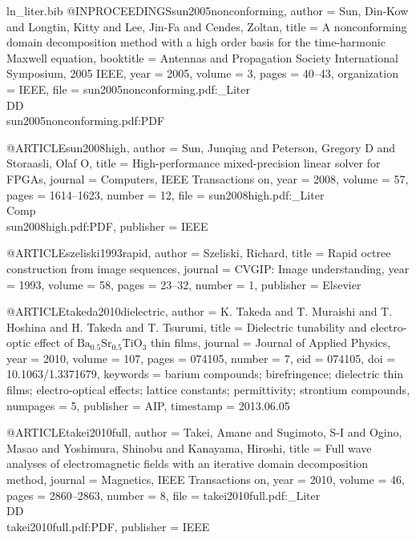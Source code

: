 \begin{filecontents*}{ln_liter.bib}
@INPROCEEDINGS{sun2005nonconforming,
  author = {Sun, Din-Kow and Longtin, Kitty and Lee, Jin-Fa and Cendes, Zoltan},
  title = {A nonconforming domain decomposition method with a high order basis
	for the time-harmonic {M}axwell equation},
  booktitle = {Antennas and Propagation Society International Symposium, 2005 IEEE},
  year = {2005},
  volume = {3},
  pages = {40--43},
  organization = {IEEE},
  file = {sun2005nonconforming.pdf:_Liter\\DD\\sun2005nonconforming.pdf:PDF}
}

@ARTICLE{sun2008high,
  author = {Sun, Junqing and Peterson, Gregory D and Storaasli, Olaf O},
  title = {High-performance mixed-precision linear solver for {FPGAs}},
  journal = {Computers, IEEE Transactions on},
  year = {2008},
  volume = {57},
  pages = {1614--1623},
  number = {12},
  file = {sun2008high.pdf:_Liter\\Comp\\sun2008high.pdf:PDF},
  publisher = {IEEE}
}

@ARTICLE{szeliski1993rapid,
  author = {Szeliski, Richard},
  title = {Rapid octree construction from image sequences},
  journal = {CVGIP: Image understanding},
  year = {1993},
  volume = {58},
  pages = {23--32},
  number = {1},
  publisher = {Elsevier}
}

@ARTICLE{takeda2010dielectric,
  author = {K. Takeda and T. Muraishi and T. Hoshina and H. Takeda and T. Tsurumi},
  title = {Dielectric tunability and electro-optic effect of $\mathrm{Ba}_{0.5}\mathrm{Sr}_{0.5}\mathrm{TiO}_{3}$
	thin films},
  journal = {Journal of Applied Physics},
  year = {2010},
  volume = {107},
  pages = {074105},
  number = {7},
  eid = {074105},
  doi = {10.1063/1.3371679},
  keywords = {barium compounds; birefringence; dielectric thin films; electro-optical
	effects; lattice constants; permittivity; strontium compounds},
  numpages = {5},
  publisher = {AIP},
  timestamp = {2013.06.05}
}

@ARTICLE{takei2010full,
  author = {Takei, Amane and Sugimoto, S-I and Ogino, Masao and Yoshimura, Shinobu
	and Kanayama, Hiroshi},
  title = {Full wave analyses of electromagnetic fields with an iterative domain
	decomposition method},
  journal = {Magnetics, IEEE Transactions on},
  year = {2010},
  volume = {46},
  pages = {2860--2863},
  number = {8},
  file = {takei2010full.pdf:_Liter\\DD\\takei2010full.pdf:PDF},
  publisher = {IEEE}
}


\end{filecontents*}
